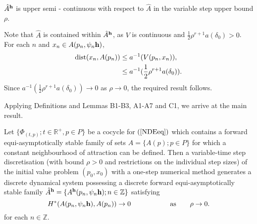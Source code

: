 \begin{lemma}
$\hat{A}^{\bf h}$ is upper semi - continuous with respect to
$\hat{A}$ in the variable step upper bound $\rho$.
\end{lemma}
\begin{prf}
Note that $\hat{A}$ is contained within $\hat{A}^{\bf h}$, as $V$
is continuous and $\frac{1}{2}\rho^{r+1}a(\delta_0)
>0$. For each $n$ and $x_n \in A(p_n, \psi_n{\bf
h})$,
\begin{align*}
  {\rm dist}(x_n, A(p_n)) &\leq a^{-1} (V(p_n, x_n)), \\
  &\leq a^{-1}(\frac{1}{2}\rho^{r+1}a(\delta_0)). \\
\end{align*}
Since $a^{-1}(\frac{1}{2}\rho^{r+1}a(\delta_0)) \to 0$ as $\rho \to 0$, the
required result follows.
\end{prf}

Applying Definitions and Lemmas B1-B3, A1-A7 and C1, we arrive at
the main result.

\begin{therm}
\label{numeasthm1} Let $\{ \Phi_{(t, p)}; t \in \mathbb{R}^+, p
\in P \}$ be a cocycle for $(\ref{NDEeq})$ which contains a
forward equi-asymptotically stable family of sets $\hat{A} = \{
A(p) ; p \in P\}$ for which a constant neighbourhood of attraction
can be defined. Then a variable-time step discretisation (with
bound $\rho > 0$ and restrictions on the individual step sizes)
of the initial value problem $(p_0, x_0)$
with a one-step numerical method generates a
discrete dynamical system possessing a discrete forward
equi-asymptotically stable family $\hat{A}^{{\bf h}} = \{
A^{{\bf h}}(p_n , \psi_n{\bf h}) ; n \in \mathbb{Z} \}$ satisfying
\begin{equation}
\label{con2eq}
 H^*( A(p_n, \psi_n {\bf h}), A(p_n)) \to 0 \hspace{2cm} \text{as} \qquad \rho
\to  0.
\end{equation}
for each $n \in \mathbb{Z}$.
\end{therm}



